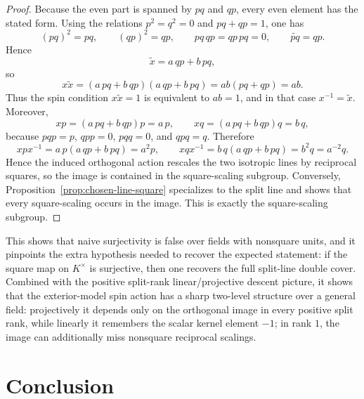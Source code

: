 \documentclass[11pt,a4paper]{article}
\theoremstyle{plain}
\theoremstyle{definition}
\theoremstyle{remark}
\begin{document}
\begin{proof}
Because the even part is spanned by $pq$ and $qp$, every even element has the
stated form. Using the relations $p^2=q^2=0$ and $pq+qp=1$, one has
\[
  (pq)^2=pq,\qquad (qp)^2=qp,\qquad pq\,qp=qp\,pq=0,\qquad \widetilde{pq}=qp.
\]
Hence
\[
  \tilde x = a\,qp+b\,pq,
\]
so
\[
  x\tilde x
  =(a\,pq+b\,qp)(a\,qp+b\,pq)
  =ab(pq+qp)
  =ab.
\]
Thus the spin condition $x\tilde x=1$ is equivalent to $ab=1$, and in that case
$x^{-1}=\tilde x$. Moreover,
\[
  xp=(a\,pq+b\,qp)p=a\,p,\qquad xq=(a\,pq+b\,qp)q=b\,q,
\]
because $pqp=p$, $qpp=0$, $pqq=0$, and $qpq=q$. Therefore
\[
  xpx^{-1}=a\,p(a\,qp+b\,pq)=a^2p,
  \qquad
  xqx^{-1}=b\,q(a\,qp+b\,pq)=b^2q=a^{-2}q.
\]
Hence the induced orthogonal action rescales the two isotropic lines by
reciprocal squares, so the image is contained in the square-scaling subgroup.
Conversely, Proposition~\ref{prop:chosen-line-square} specializes to the split
line and shows that every square-scaling occurs in the image. This is exactly
the square-scaling subgroup.
\end{proof}

This shows that naive surjectivity is false over fields with nonsquare units,
and it pinpoints the extra hypothesis needed to recover the expected statement:
if the square map on $K^\times$ is surjective, then one recovers the full
split-line double cover. Combined with the positive split-rank
linear/projective descent picture, it shows that the exterior-model spin action
has a sharp two-level structure over a general field: projectively it depends
only on the orthogonal image in every positive split rank, while linearly it
remembers the scalar kernel element $-1$; in rank $1$, the image can
additionally miss nonsquare reciprocal scalings.

\section{Conclusion}
\label{sec:conclusion}
\end{document}
